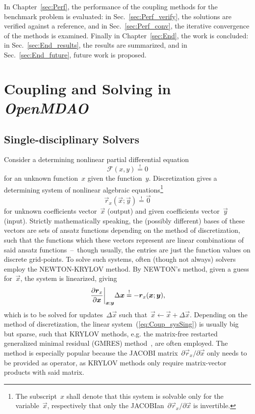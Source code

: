 \documentclass[10pt, ngerman, english,
twoside, open=right,
numbers=noenddot,
declaration=section,
abstract=section,
abstract=multiple,
abstract=notoc,
declaration=notoc,
cd=pale, 
chapterprefix=off, 
chapterpage=false, 
headingsvskip=-10em,
cdgeometry=custom, 
slantedgreek=on,
cdmath=on, 
cdfont=on,
ttfont=false,
mathswap=off,
]{tudscrreprt}
\numberwithin{equation}{chapter}
\renewcommand{\textsc}[1]{\uppercase{\mbox{#1}}}
\newcommand{\sidenote}[1]{
  \leavevmode %
  \marginpar{\hyphenpenalty=1000 \flushleft{\textcolor{HKS41}{#1}}}}
\begin{document}
In Chapter~\ref{sec:Perf}, the performance of the coupling methods for the benchmark problem is evaluated: in Sec.~\ref{sec:Perf_verify}, the solutions are verified against a reference, and in Sec.~\ref{sec:Perf_conv}, the iterative convergence of the methods is examined. 
Finally in Chapter~\ref{sec:End}, the work is concluded: in Sec.~\ref{sec:End_results}, the results are summarized, and in Sec.~\ref{sec:End_future}, future work is proposed.
\chapter{Coupling and Solving in \textit{OpenMDAO}}\label{sec:Coup}
\section{Single-disciplinary Solvers}\label{sec:Coup_single}
\sidenote{\textsc{Newton}-\textsc{Krylov}}Consider a determining nonlinear partial differential equation
\begin{equation}
\mathcal{F}(x,y) \overset!= 0
\end{equation}
for an unknown function~$x$ given the function~$y$. Discretization gives a determining system of nonlinear algebraic equations\footnote{The subscript~$x$ shall denote that this system is solvable only for the variable~$\vec{x}$, respectively that only the \textsc{Jacobi}an~$\partial\vec{r}_x/\partial\vec{x}$ is invertible.}
\begin{equation}
\vec{r}_x(\vec{x};\vec{y}) \overset!= \vec{0}
\end{equation}
for unknown coefficients vector~$\vec{x}$ (output) and given coefficients vector~$\vec{y}$ (input). Strictly mathematically speaking, the (possibly different) bases of these vectors are sets of ansatz functions depending on the method of discretization, such that the functions which these vectors represent are linear combinations of said ansatz functions~--~though usually, the entries are just the function values on discrete grid-points. To solve such systems, often (though not always) solvers employ the \textsc{Newton}-\textsc{Krylov} method. By \textsc{Newton}'s method, given a guess for~$\vec{x}$, the system is linearized, giving
\begin{equation}
\pdiffa{\vec{r}_x}{\vec{x}}{\vec{x};\vec{y}} \Delta\vec{x} \overset!= -\vec{r}_x(\vec{x};\vec{y})\text{,}\label{eq:Coup_sysSing}
\end{equation}
which is to be solved for updates~$\Delta\vec{x}$ such that~$\vec{x} \gets \vec{x} + \Delta\vec{x}$. Depending on the method of discretization, the linear system~(\ref{eq:Coup_sysSing}) is usually big but sparse, such that \textsc{Krylov} methods, e.g. the matrix-free restarted generalized minimal residual (GMRES) method~\cite{GMRES}, are often employed. The method is especially popular because the \textsc{Jacobi} matrix~$\partial\vec{r}_x/\partial\vec{x}$ only needs to be provided as operator, as \textsc{Krylov} methods only require matrix-vector products with said matrix.\par
\end{document}
